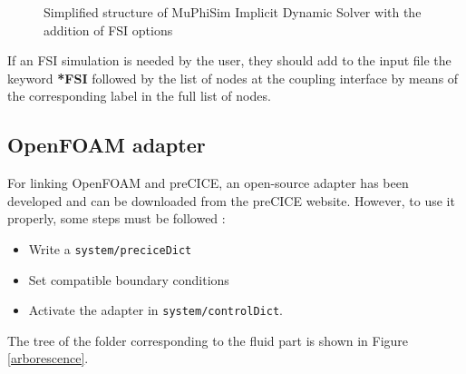 \documentclass[oneside,11pt,times]{book}
\begin{document}
\begin{figure}[H]
	\caption{Simplified structure of MuPhiSim Implicit Dynamic Solver with the addition of FSI options}
	\label{fig:solverIDFSI}
\end{figure}

If an FSI simulation is needed by the user, they should add to the input file the keyword \textbf{*FSI} followed by the list of nodes at the coupling interface by means of the corresponding label in the full list of nodes.\\

\subsection{OpenFOAM adapter}
For linking OpenFOAM and preCICE, an open-source adapter has been developed and can be downloaded from the preCICE website. However, to use it properly, some steps must be followed :
\begin{itemize}
    \item Write a \texttt{system/preciceDict}
    \item Set compatible boundary conditions
    \item Activate the adapter in \texttt{system/controlDict}.
\end{itemize}

The tree of the folder corresponding to the fluid part is shown in Figure \ref{arborescence}.
\end{document}
